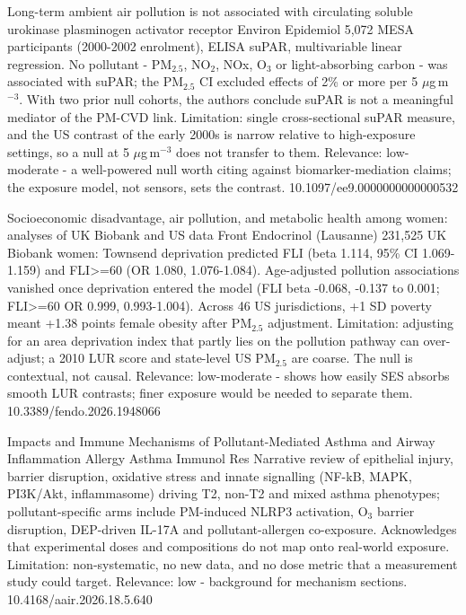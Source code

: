 \documentclass[10pt]{article}
\begin{document}
{Long-term ambient air pollution is not associated with circulating soluble urokinase plasminogen activator receptor}
{Environ Epidemiol}
{5,072 MESA participants (2000-2002 enrolment), ELISA suPAR, multivariable linear regression. No pollutant - PM$_{2.5}$, NO$_2$, NOx, O$_3$ or light-absorbing carbon - was associated with suPAR; the PM$_{2.5}$ CI excluded effects of 2\% or more per 5 $\mu$g\,m$^{-3}$. With two prior null cohorts, the authors conclude suPAR is not a meaningful mediator of the PM-CVD link. Limitation: single cross-sectional suPAR measure, and the US contrast of the early 2000s is narrow relative to high-exposure settings, so a null at 5 $\mu$g\,m$^{-3}$ does not transfer to them. Relevance: low-moderate - a well-powered null worth citing against biomarker-mediation claims; the exposure model, not sensors, sets the contrast.}
{10.1097/ee9.0000000000000532}

{Socioeconomic disadvantage, air pollution, and metabolic health among women: analyses of UK Biobank and US data}
{Front Endocrinol (Lausanne)}
{231,525 UK Biobank women: Townsend deprivation predicted FLI (beta 1.114, 95\% CI 1.069-1.159) and FLI>=60 (OR 1.080, 1.076-1.084). Age-adjusted pollution associations vanished once deprivation entered the model (FLI beta -0.068, -0.137 to 0.001; FLI>=60 OR 0.999, 0.993-1.004). Across 46 US jurisdictions, +1 SD poverty meant +1.38 points female obesity after PM$_{2.5}$ adjustment. Limitation: adjusting for an area deprivation index that partly lies on the pollution pathway can over-adjust; a 2010 LUR score and state-level US PM$_{2.5}$ are coarse. The null is contextual, not causal. Relevance: low-moderate - shows how easily SES absorbs smooth LUR contrasts; finer exposure would be needed to separate them.}
{10.3389/fendo.2026.1948066}

\par{}\baselineskip{}\baselineskip
{}

{Impacts and Immune Mechanisms of Pollutant-Mediated Asthma and Airway Inflammation}
{Allergy Asthma Immunol Res}
{Narrative review of epithelial injury, barrier disruption, oxidative stress and innate signalling (NF-kB, MAPK, PI3K/Akt, inflammasome) driving T2, non-T2 and mixed asthma phenotypes; pollutant-specific arms include PM-induced NLRP3 activation, O$_3$ barrier disruption, DEP-driven IL-17A and pollutant-allergen co-exposure. Acknowledges that experimental doses and compositions do not map onto real-world exposure. Limitation: non-systematic, no new data, and no dose metric that a measurement study could target. Relevance: low - background for mechanism sections.}
{10.4168/aair.2026.18.5.640}
\end{document}
